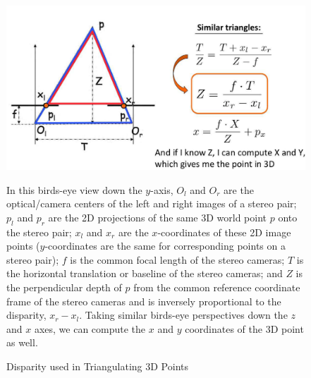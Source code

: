 \begin{figure}[!h]
    \includegraphics[width=1\columnwidth]{figures/disparity-triangulation.png}
    \caption{Disparity used in Triangulating 3D Points~\cite{fidler_depth_2021}}
    \label{fig:disparity-triangulation}
    {\small In this birds-eye view down the $y$-axis, $O_l$ and $O_r$ are the optical/camera centers of the left and right images of a stereo pair; $p_l$ and $p_r$ are the 2D projections of the same 3D world point $p$ onto the stereo pair; $x_l$ and $x_r$ are the $x$-coordinates of these 2D image points ($y$-coordinates are the same for corresponding points on a stereo pair); $f$ is the common focal length of the stereo cameras; $T$ is the horizontal translation or baseline of the stereo cameras; and $Z$ is the perpendicular depth of $p$ from the common reference coordinate frame of the stereo cameras and is inversely proportional to the disparity, $x_r - x_l$. Taking similar birds-eye perspectives down the $z$ and $x$ axes, we can compute the $x$ and $y$ coordinates of the 3D point as well.}
\end{figure}

